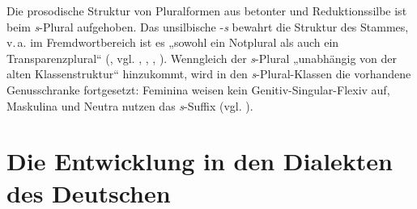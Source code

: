 Die prosodische Struktur von Pluralformen aus betonter und Reduktionssilbe ist beim \textit{s}{}-Plural aufgehoben. Das unsilbische -\textit{s} bewahrt die Struktur des Stammes, v.\,a. im Fremdwortbereich ist es „sowohl ein Notplural als auch ein Transparenzplural“ (\citealt{Wegener2003}, vgl. \citealt[151]{AckermannZimmer2017}, \citealt[152--156]{Köpcke1993}, \citealt{Wegener1999}, \citealt[137--138]{Wiese1996}). Wenngleich der \textit{s}{}-Plural „unabhängig von der alten Klassenstruktur“ \citep[94]{Kürschner2008a} hinzukommt, wird in den \textit{s}{}-Plural-Klassen die vorhandene Genusschranke fortgesetzt: Feminina weisen kein Genitiv-Singular-Flexiv auf, Maskulina und Neutra nutzen das \textit{s}{}-Suffix (vgl. \citealt[299]{Nübling2008}).

\section{Die Entwicklung in den Dialekten des Deutschen}
\label{sec:4.2}
